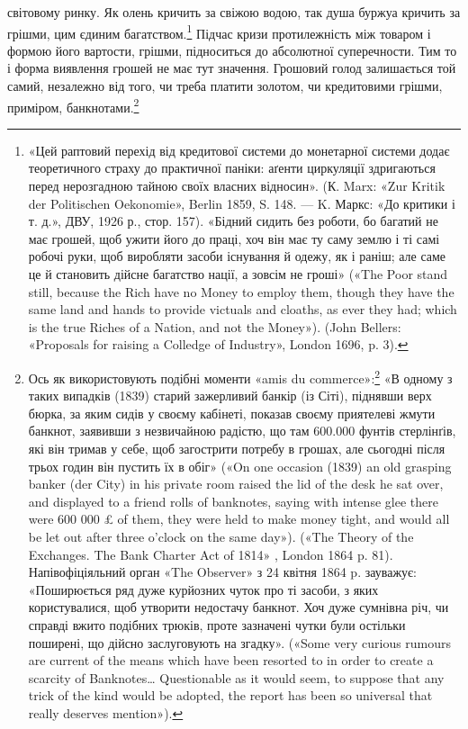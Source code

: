 \parcont{}  %
світовому ринку. Як олень кричить за свіжою водою, так душа буржуа кричить за грішми, цим єдиним
багатством.\footnote{
«Цей раптовий перехід від кредитової системи до монетарної системи додає теоретичного страху до
практичної паніки: аґенти циркуляції здригаються перед нерозгадною тайною своїх власних відносин».
(К. Marx: «Zur Kritik der Politischen Oekonomie», Berlin 1859, S. 148. — K. Маркс: «До критики і т.
д.», ДВУ, 1926 р., стор. 157). «Бідний сидить без роботи, бо багатий не має грошей, щоб ужити його
до праці, хоч він має ту саму землю і ті самі робочі руки, щоб виробляти засоби існування й одежу,
як і раніш; але саме це й становить дійсне багатство нації, а зовсім не гроші» («The Poor stand
still, because the Rich have no Money to employ them, though they have the same land and hands to
provide victuals and cloaths, as ever they had; which is the true Riches of a Nation, and not the
Money»). (John Bellers: «Proposals for raising a Colledge of
Industry», London 1696, p. 3).
} Підчас кризи протилежність між товаром і формою його вартости, грішми, підноситься до
абсолютної суперечности. Тим то і форма виявлення грошей не має тут значення. Грошовий голод
залишається той самий, незалежно від того, чи треба платити золотом, чи кредитовими грішми,
приміром, банкнотами.\footnote{
Ось як використовують подібні моменти «amis du commerce»:\footnote*{
— друзі торговлі. \emph{Ред.}
} «В одному з таких випадків (1839)
старий зажерливий банкір (із Сіті), піднявши верх бюрка, за яким сидів у своєму кабінеті, показав
своєму приятелеві жмути банкнот, заявивши з незвичайною радістю, що там 600.000 фунтів стерлінґів,
які він тримав у себе, щоб загострити потребу в грошах, але сьогодні після трьох годин він пустить
їх в обіг» («On one occasion (1839) an old grasping banker (der City) in his private room raised the
lid of the desk he sat over, and displayed to a friend rolls of banknotes, saying with intense glee
there were 600 000 £ of them, they were held to make money tight, and would all be let out after
three o'clock on the same day»). («The Theory of the Exchanges. The Bank Charter Act of 1814» ,
London 1864 p. 81). Напівофіціяльний орган «The Observer» з 24 квітня 1864 p. зауважує: «Поширюється
ряд дуже курйозних чуток про ті засоби, з яких користувалися, щоб утворити недостачу банкнот. Хоч
дуже сумнівна річ, чи справді вжито подібних трюків, проте зазначені чутки були остільки поширені,
що дійсно заслуговують на згадку». («Some very curious rumours are current of the means which have
been resorted to in order to create a scarcity of Banknotes\dots{} Questionable as it would seem, to
suppose that any trick of the kind would be adopted, the report has been so universal that really
deserves mention»).
}

